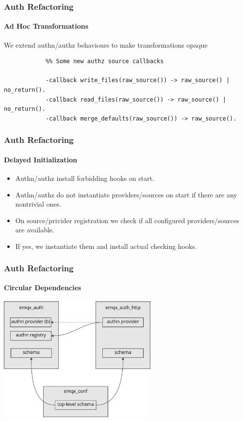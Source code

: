 \documentclass{beamer}
\begin{document}
\begin{frame}[fragile]
    \frametitle{Auth Refactoring}
    \framesubtitle{Ad Hoc Transformations}

    \begin{center}
        We extend authn/authz behaviours to make transformations opaque
        \begin{lstlisting}
            %% Some new authz source callbacks

            -callback write_files(raw_source()) -> raw_source() | no_return().
            -callback read_files(raw_source()) -> raw_source() | no_return().
            -callback merge_defaults(raw_source()) -> raw_source().
        \end{lstlisting}
    \end{center}
\end{frame}


\begin{frame}[fragile]
    \frametitle{Auth Refactoring}
    \framesubtitle{Delayed Initialization}

    \begin{center}
        \begin{itemize}
            \item Authn/authz install forbidding hooks on start.
            \item Authn/authz do not instantiate providers/sources on start if there are any nontrivial ones.
            \item On source/privider registration we check if all configured providers/sources are available.
            \item If yes, we instantiate them and install actual checking hooks.
        \end{itemize}
    \end{center}
\end{frame}

\begin{frame}
    \frametitle{Auth Refactoring}
    \framesubtitle{Circular Dependencies}

    \begin{center}
        \includegraphics[width=8cm, keepaspectratio]{images/schema-deps.png}
    \end{center}
\end{frame}
\end{document}
